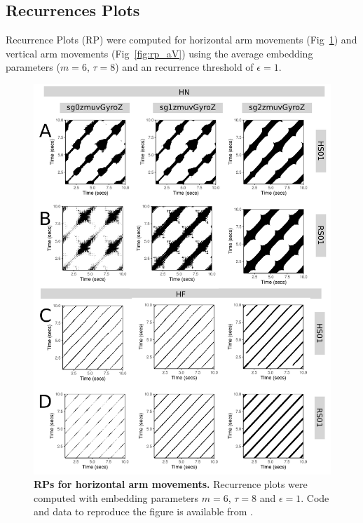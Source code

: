 \documentclass[fleqn,10pt]{wlscirep}
\begin{document}
\subsection*{Recurrences Plots}
Recurrence Plots (RP) were computed for horizontal arm movements (Fig~\ref{fig:rp_aH}) and 
vertical arm movements (Fig~\ref{fig:rp_aV}) 
using the average embedding parameters ($m=6$, $\tau=8$) 
and an recurrence threshold of $\epsilon=1$.


\begin{figure}[ht]
\centering
\includegraphics[width=1.0\textwidth]{figures/rps/pdf/rp_aH}
\caption{
	{\bf RPs for horizontal arm movements.}	
	Recurrence plots were computed with 
	embedding parameters $m=6$, $\tau=8$ and $\epsilon=1$.
	Code and data to reproduce the figure is available from \cite{srep2019}.
        }
    \label{fig:rp_aH}
\end{figure}
\end{document}
